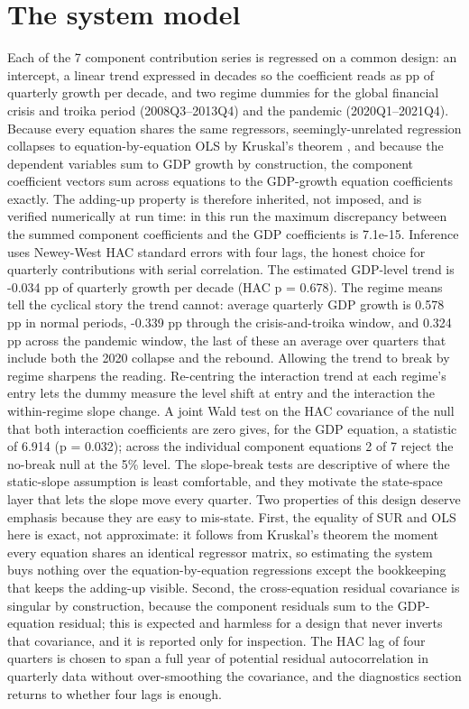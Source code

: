 \documentclass[11pt,a4paper]{article}
\begin{document}
\section{The system model}
Each of the 7 component contribution series is regressed on a common design: an intercept, a linear trend expressed in decades so the coefficient reads as pp of quarterly growth per decade, and two regime dummies for the global financial crisis and troika period (2008Q3--2013Q4) and the pandemic (2020Q1--2021Q4). Because every equation shares the same regressors, seemingly-unrelated regression collapses to equation-by-equation OLS by Kruskal's theorem \cite{kruskal1968}, and because the dependent variables sum to GDP growth by construction, the component coefficient vectors sum across equations to the GDP-growth equation coefficients exactly. The adding-up property is therefore inherited, not imposed, and is verified numerically at run time: in this run the maximum discrepancy between the summed component coefficients and the GDP coefficients is 7.1e-15. Inference uses Newey-West HAC standard errors \cite{neweywest1987} with four lags, the honest choice for quarterly contributions with serial correlation. The estimated GDP-level trend is -0.034 pp of quarterly growth per decade (HAC p = 0.678). The regime means tell the cyclical story the trend cannot: average quarterly GDP growth is 0.578 pp in normal periods, -0.339 pp through the crisis-and-troika window, and 0.324 pp across the pandemic window, the last of these an average over quarters that include both the 2020 collapse and the rebound.
Allowing the trend to break by regime sharpens the reading. Re-centring the interaction trend at each regime's entry lets the dummy measure the level shift at entry and the interaction the within-regime slope change. A joint Wald test on the HAC covariance of the null that both interaction coefficients are zero gives, for the GDP equation, a statistic of 6.914 (p = 0.032); across the individual component equations 2 of 7 reject the no-break null at the 5\% level. The slope-break tests are descriptive of where the static-slope assumption is least comfortable, and they motivate the state-space layer that lets the slope move every quarter.
Two properties of this design deserve emphasis because they are easy to mis-state. First, the equality of SUR and OLS here is exact, not approximate: it follows from Kruskal's theorem the moment every equation shares an identical regressor matrix, so estimating the system buys nothing over the equation-by-equation regressions except the bookkeeping that keeps the adding-up visible. Second, the cross-equation residual covariance is singular by construction, because the component residuals sum to the GDP-equation residual; this is expected and harmless for a design that never inverts that covariance, and it is reported only for inspection. The HAC lag of four quarters is chosen to span a full year of potential residual autocorrelation in quarterly data without over-smoothing the covariance, and the diagnostics section returns to whether four lags is enough.
\end{document}

